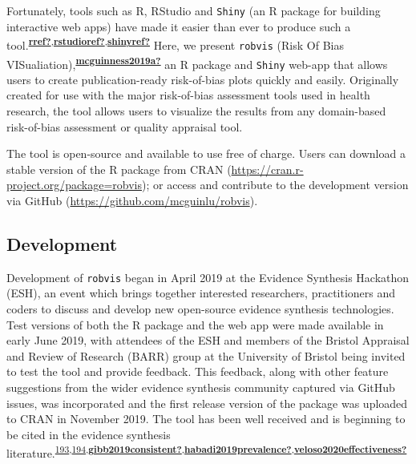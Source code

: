 \documentclass[a4paper, twoside]{templates/ociamthesis}
\begin{document}
Fortunately, tools such as R, RStudio and \texttt{Shiny} (an R package for building interactive web apps) have made it easier than ever to produce such a tool.\textsuperscript{\protect\hyperlink{ref-rref}{\textbf{rref?}},\protect\hyperlink{ref-rstudioref}{\textbf{rstudioref?}},\protect\hyperlink{ref-shinyref}{\textbf{shinyref?}}} Here, we present \texttt{robvis} (Risk Of Bias VISualiation),\textsuperscript{\protect\hyperlink{ref-mcguinness2019a}{\textbf{mcguinness2019a?}}} an R package and \texttt{Shiny} web-app that allows users to create publication-ready risk-of-bias plots quickly and easily. Originally created for use with the major risk-of-bias assessment tools used in health research, the tool allows users to visualize the results from any domain-based risk-of-bias assessment or quality appraisal tool.

The tool is open-source and available to use free of charge. Users can download a stable version of the R package from CRAN (\url{https://cran.r-project.org/package=robvis}); or access and contribute to the development version via GitHub (\url{https://github.com/mcguinlu/robvis}).

\hypertarget{development-1}{%
\subsection{Development}\label{development-1}}

Development of \texttt{robvis} began in April 2019 at the Evidence Synthesis Hackathon (ESH), an event which brings together interested researchers, practitioners and coders to discuss and develop new open-source evidence synthesis technologies. Test versions of both the R package and the web app were made available in early June 2019, with attendees of the ESH and members of the Bristol Appraisal and Review of Research (BARR) group at the University of Bristol being invited to test the tool and provide feedback. This feedback, along with other feature suggestions from the wider evidence synthesis community captured via GitHub issues, was incorporated and the first release version of the package was uploaded to CRAN in November 2019. The tool has been well received and is beginning to be cited in the evidence synthesis literature.\textsuperscript{\protect\hyperlink{ref-simillis2020}{193},\protect\hyperlink{ref-tanneru2020}{194},\protect\hyperlink{ref-gibb2019consistent}{\textbf{gibb2019consistent?}},\protect\hyperlink{ref-habadi2019prevalence}{\textbf{habadi2019prevalence?}},\protect\hyperlink{ref-veloso2020effectiveness}{\textbf{veloso2020effectiveness?}}}
\end{document}
